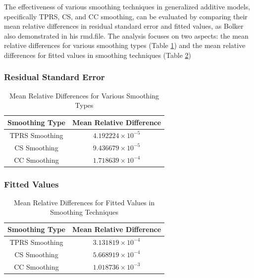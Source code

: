 \documentclass[12pt, twoside,hidelinks]{article}
\theoremstyle{definition}
\numberwithin{equation}{section}
\begin{document}
The effectiveness of various smoothing techniques in generalized additive models, specifically TPRS, CS, and CC smoothing, can be evaluated by comparing their mean relative differences in residual standard error and fitted values, as Bolker also demonstrated in his rmd.file. The analysis focuses on two aspects: the mean relative differences for various smoothing types (Table \ref{tab:smoothing_differences}) and the mean relative differences for fitted values in smoothing techniques (Table \ref{tab:fitted_values_smoothing_differences_sci})

\subsubsection*{Residual Standard Error}

\begin{table}[h]
\centering
\begin{tabular}{|c|c|}
\hline
\textbf{Smoothing Type} & \textbf{Mean Relative Difference} \\ \hline
TPRS Smoothing         & \(4.192224 \times 10^{-5}\)        \\ \hline
CS Smoothing           & \(9.436679 \times 10^{-5}\)        \\ \hline
CC Smoothing           & \(1.718639 \times 10^{-4}\)                   \\ \hline
\end{tabular}
\caption{Mean Relative Differences for Various Smoothing Types}
\label{tab:smoothing_differences}
\end{table}





\subsubsection*{Fitted Values}

\begin{table}[h]
\centering
\begin{tabular}{|c|c|}
\hline
\textbf{Smoothing Type} & \textbf{Mean Relative Difference} \\ \hline
TPRS Smoothing         & \(3.131819 \times 10^{-4}\)        \\ \hline
CS Smoothing           & \(5.668919 \times 10^{-4}\)        \\ \hline
CC Smoothing           & \(1.018736 \times 10^{-3}\)        \\ \hline
\end{tabular}
\caption{Mean Relative Differences for Fitted Values in Smoothing Techniques}
\label{tab:fitted_values_smoothing_differences_sci}
\end{table}
\end{document}
